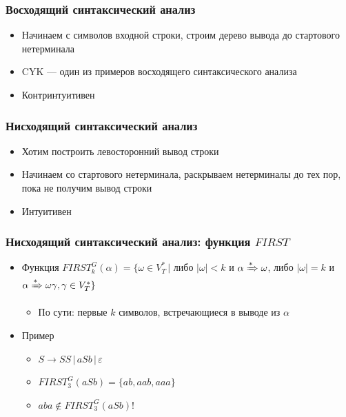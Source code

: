 \documentclass{beamer}
\newcommand{\derive}[0]{\xRightarrow[]{*}}
\begin{document}
\begin{frame}[fragile]
  \transwipe[direction=90]
  \frametitle{Восходящий синтаксический анализ}
  \begin{itemize}
      \item Начинаем с символов входной строки, строим дерево вывода до стартового нетерминала
      \item CYK --- один из примеров восходящего синтаксического анализа
      \item Контринтуитивен 
  \end{itemize}
\end{frame}

\begin{frame}[fragile]
  \transwipe[direction=90]
  \frametitle{Нисходящий синтаксический анализ}
  \begin{itemize}
      \item Хотим построить левосторонний вывод строки
      \item Начинаем со стартового нетерминала, раскрываем нетерминалы до тех пор, пока не получим вывод строки
      \item Интуитивен
  \end{itemize}
\end{frame}

\begin{frame}[fragile]
  \transwipe[direction=90]
  \frametitle{Нисходящий синтаксический анализ: функция $FIRST$}
  \begin{itemize}
      \item Функция $FIRST^G_k(\alpha) = \{ \omega \in V_T^* \, |$ либо $|\omega| < k$ и $ \alpha \derive \omega$, либо $|\omega| = k$ и $\alpha \derive \omega \gamma, \gamma \in V_T^*\}$
      \begin{itemize}
        \item По сути: первые $k$ символов, встречающиеся в выводе из $\alpha$
      \end{itemize}
      \item Пример
      \begin{itemize}
        \item $S \rightarrow S S \, | \, a S b \, | \, \varepsilon$
        \item $FIRST^G_3( a S b ) = \{ ab, aab, aaa\} $
        \item $aba \notin FIRST^G_3 (a S b)$!
      \end{itemize}    
  \end{itemize}
\end{frame}
\end{document}
